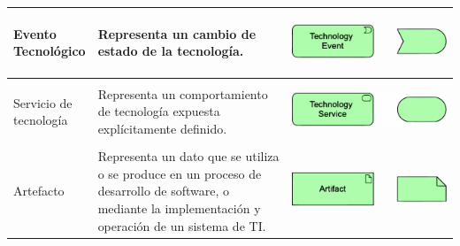\begin{longtable}{|p{0.15\linewidth}|p{0.45\linewidth}|p{0.4\linewidth} |}
    Evento Tecnológico
    &
    Representa un cambio de estado de la 
    tecnología.
    &
\begin{center}
    \includegraphics[width=0.8\linewidth]{imgs/capa_tecnologia/Technology event.pdf}
\end{center} 
    \\ \hline

    Servicio de tecnología
    &
    Representa un comportamiento de tecnología 
    expuesta explícitamente definido.
    &
\begin{center}
    \includegraphics[width=0.8\linewidth]{imgs/capa_tecnologia/Technology service.pdf}
\end{center} 
    \\ \hline

    Artefacto
    &
    Representa un dato que se utiliza o se produce 
        en un proceso de desarrollo de software, o 
        mediante la implementación y operación de un 
        sistema de TI.
    &
\begin{center}
    \includegraphics[width=0.8\linewidth]{imgs/capa_tecnologia/Artifact.pdf}
\end{center} 
    \\ \hline

\end{longtable}